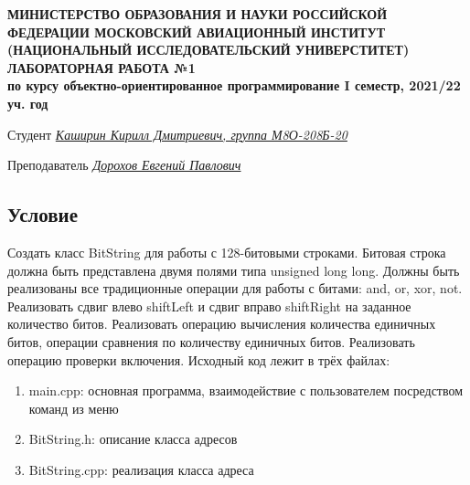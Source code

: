 \documentclass[12pt]{article}
\begin{document}
\begin{titlepage}
\begin{center}
\textbf{МИНИСТЕРСТВО ОБРАЗОВАНИЯ И НАУКИ РОССИЙСКОЙ ФЕДЕРАЦИИ
\medskip
МОСКОВСКИЙ АВИАЦИОННЫЙ ИНСТИТУТ
(НАЦИОНАЛЬНЫЙ ИССЛЕДОВАТЕЛЬСКИЙ УНИВЕРСТИТЕТ)
\vfill\vfill
{\Huge ЛАБОРАТОРНАЯ РАБОТА №1} \\
по курсу объектно-ориентированное программирование
I семестр, 2021/22 уч. год}
\end{center}
\vfill

Студент \uline{\it {Каширин Кирилл Дмитриевич, группа М8О-208Б-20}\hfill}

Преподаватель \uline{\it {Дорохов Евгений Павлович}\hfill}

\vfill
\end{titlepage}

\subsection*{Условие}
Создать класс BitString для работы с 128-битовыми строками. Битовая строка
должна быть представлена двумя полями типа unsigned long long. Должны быть
реализованы все традиционные операции для работы с битами: and, or, xor, not.
Реализовать сдвиг влево shiftLeft и сдвиг вправо shiftRight на заданное количество битов. Реализовать операцию вычисления количества единичных битов, операции сравнения по количеству единичных битов. Реализовать операцию проверки
включения.
Исходный код лежит в трёх файлах:
\begin{enumerate}
\item main.cpp: основная программа, взаимодействие с пользователем посредством команд из меню
\item BitString.h:    описание класса адресов
\item BitString.cpp:  реализация класса адреса

\end{enumerate}
\pagebreak
\end{document}
